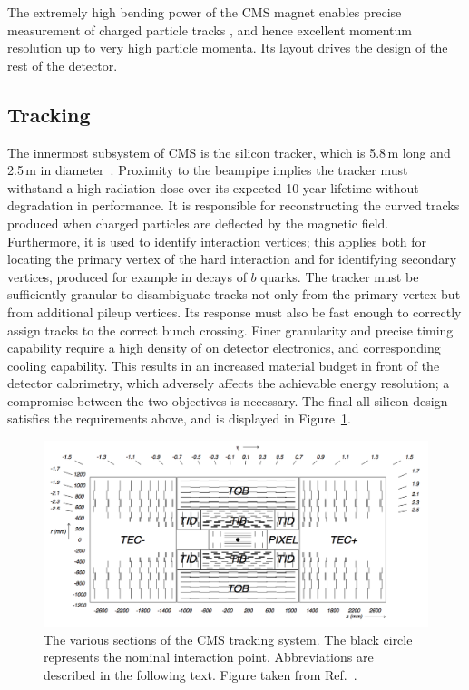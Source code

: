 The extremely high bending power of the CMS magnet enables precise measurement of charged particle tracks , 
and hence excellent momentum resolution up to very high particle momenta.
Its layout drives the design of the rest of the detector.

\subsection{Tracking}

The innermost subsystem of CMS is the silicon tracker, which is 5.8\,m long and 2.5\,m in diameter~\cite{CMSdetector,TrackReco}. 
Proximity to the beampipe implies the tracker must withstand a high radiation dose over its expected 10-year lifetime without degradation in performance.
It is responsible for reconstructing the curved tracks produced when charged particles are deflected by the magnetic field. %
Furthermore, it is used to identify interaction vertices; 
this applies both for locating the primary vertex of the hard interaction and for identifying secondary vertices, produced for example in decays of $b$ quarks.
The tracker must be sufficiently granular to disambiguate tracks not only from the primary vertex but from additional pileup vertices.
Its response must also be fast enough to correctly assign tracks to the correct bunch crossing.
Finer granularity and precise timing capability require a high density of on detector electronics, and corresponding cooling capability.
This results in an increased material budget in front of the detector calorimetry, which adversely affects the achievable energy resolution; 
a compromise between the two objectives is necessary.
The final all-silicon design satisfies the requirements above, and is displayed in Figure~\ref{fig:detector_tracker}.

\begin{figure}[h!]
  \centering
  \includegraphics[width=\textwidth]{Figures/Detector/TrackerUgly.png}
  \caption[The CMS tracker.]
  {
    The various sections of the CMS tracking system.
    The black circle represents the nominal interaction point.
    Abbreviations are described in the following text.
    Figure taken from Ref.~\cite{CMSdetector}.
  }
  \label{fig:detector_tracker}
\end{figure}


